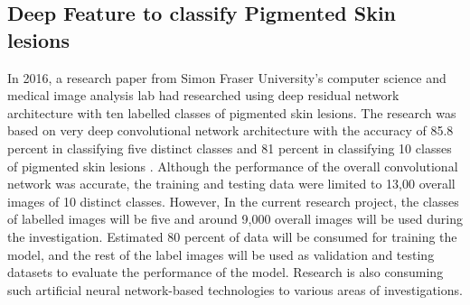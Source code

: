 \subsection*{Deep Feature to classify Pigmented Skin lesions}

In 2016, a research paper from Simon Fraser University’s computer science and medical image analysis lab had researched using 
deep residual network architecture with ten labelled 
classes of pigmented skin lesions. The research was based on very 
deep convolutional network architecture with the accuracy 
of 85.8 percent in classifying five distinct classes and
81 percent in classifying 10 classes of pigmented skin lesions
\citep{7493528}. Although the performance of the overall convolutional network was accurate, the training and testing data were limited to 13,00 overall images of 10 distinct classes.
 However, In the current research project, the classes of labelled images will be five and around 9,000 overall images will be used during the investigation.
 Estimated 80 percent of data will be consumed for training the model, and the rest of the label images will be used as validation and testing datasets 
 to evaluate the performance of the model. 
 Research is also consuming such artificial neural network-based technologies to various areas of investigations.